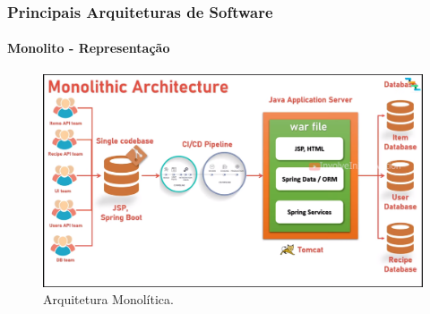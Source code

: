 \documentclass[
	10pt, %
	t, %
]{beamer}
\begin{document}
\begin{frame}
	\frametitle{Principais Arquiteturas de Software}
	\framesubtitle{Monolito - Representação}
	
	\begin{figure}
		\centering
		\includegraphics[width=0.9\linewidth]{Images/monolito2.png}
		\caption{Arquitetura Monolítica.}\label{fig:monolito}
	\end{figure}

\end{frame}
\end{document}
